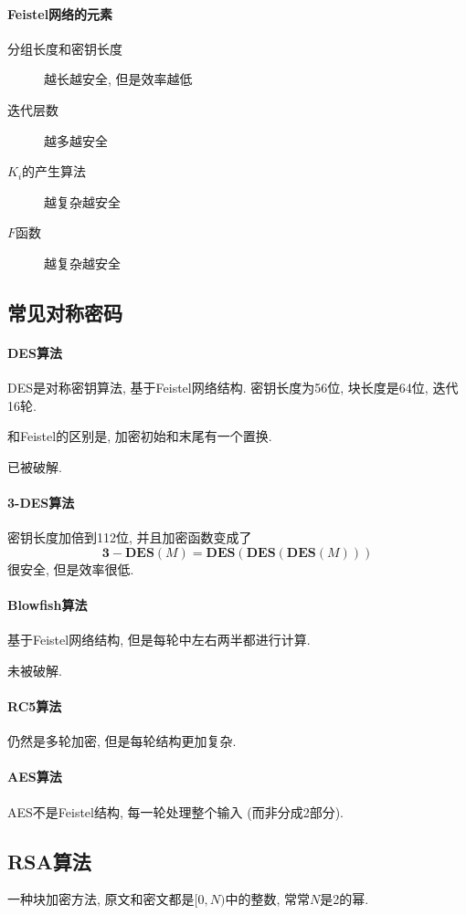 \documentclass{ctexart}
\begin{document}
\paragraph{Feistel网络的元素}
    \begin{description}
        \item[分组长度和密钥长度] 越长越安全, 但是效率越低
        \item[迭代层数] 越多越安全
        \item[$K_i$的产生算法] 越复杂越安全
        \item[$F$函数] 越复杂越安全
    \end{description}

\subsection{常见对称密码}
\paragraph{DES算法}
    DES是对称密钥算法, 基于Feistel网络结构.
    密钥长度为56位, 块长度是64位, 迭代16轮.\par
    和Feistel的区别是, 加密初始和末尾有一个置换.\par
    已被破解.
\paragraph{3-DES算法}
    密钥长度加倍到112位, 并且加密函数变成了 \[
        \mathbf{3-DES}(M) = \mathbf{DES}(\mathbf{DES}(\mathbf{DES}(M))) \]
    很安全, 但是效率很低.
\paragraph{Blowfish算法}
    基于Feistel网络结构, 但是每轮中左右两半都进行计算.\par
    未被破解.
\paragraph{RC5算法}
    仍然是多轮加密, 但是每轮结构更加复杂.
\paragraph{AES算法}
    AES不是Feistel结构, 每一轮处理整个输入 (而非分成2部分).

\subsection{RSA算法}
    一种块加密方法, 原文和密文都是$[0, N)$中的整数, 常常$N$是2的幂.\par
\end{document}
